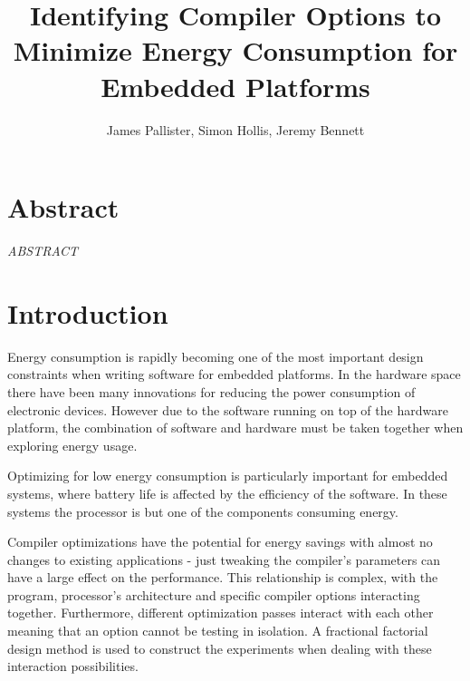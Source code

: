 \documentclass[twocolumn]{article}
\title{\bfseries Identifying Compiler Options to Minimize Energy Consumption for Embedded Platforms}
\author{James Pallister, Simon Hollis, Jeremy Bennett}
\begin{document}
\maketitle
\section*{Abstract}

\textit{ABSTRACT}

\section*{Introduction}

Energy consumption is rapidly becoming one of the most important design constraints when writing software for embedded platforms. In the hardware space there have been many innovations for reducing the power consumption of electronic devices. However due to the software running on top of the hardware platform, the combination of software and hardware must be taken together when exploring energy usage.

Optimizing for low energy consumption is particularly important for embedded systems, where battery life is affected by the efficiency of the software. In these systems the processor is but one of the components consuming energy.

Compiler optimizations have the potential for energy savings with almost no changes to existing applications - just tweaking the compiler's parameters can have a large effect on the performance. This relationship is complex, with the program, processor's architecture and specific compiler options interacting together. Furthermore, different optimization passes interact with each other meaning that an option cannot be testing in isolation. A fractional factorial design method is used to construct the experiments when dealing with these interaction possibilities.
\end{document}

